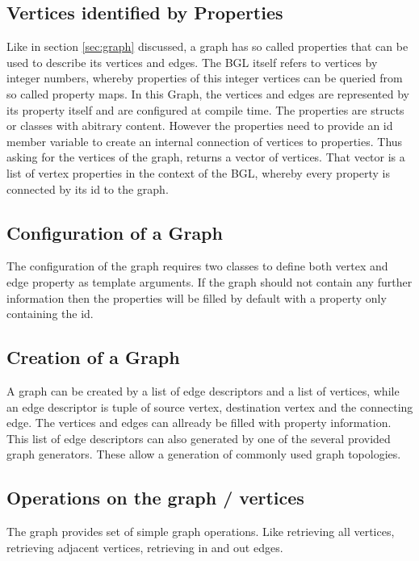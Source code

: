 \subsection{Vertices identified by Properties}

Like in section \ref{sec:graph} discussed, a graph has so called
properties that can be used to describe its vertices and edges. The
BGL itself refers to vertices by integer numbers, whereby properties
of this integer vertices can be queried from so called property
maps. In this Graph, the vertices and edges are represented by its
property itself and are configured at compile time.  The properties
are structs or classes with abitrary content. However the properties
need to provide an id member variable to create an internal connection
of vertices to properties.  Thus asking for the vertices of the graph,
returns a vector of vertices. That vector is a list of vertex
properties in the context of the BGL, whereby every property is
connected by its id to the graph.

\subsection{Configuration of a Graph}
The configuration of the graph requires two classes to define both
vertex and edge property as template arguments.  If the graph should
not contain any further information then the properties will be filled
by default with a property only containing the id.

\subsection{Creation of a Graph}
A graph can be created by a list of edge descriptors and a list of
vertices, while an edge descriptor is tuple of source vertex,
destination vertex and the connecting edge. The vertices and edges can
allready be filled with property information.  This list of edge
descriptors can also generated by one of the several provided graph
generators. These allow a generation of commonly used graph
topologies.


\subsection{Operations on the graph / vertices}
The graph provides set of simple graph operations. Like retrieving all
vertices, retrieving adjacent vertices, retrieving in and out edges.

